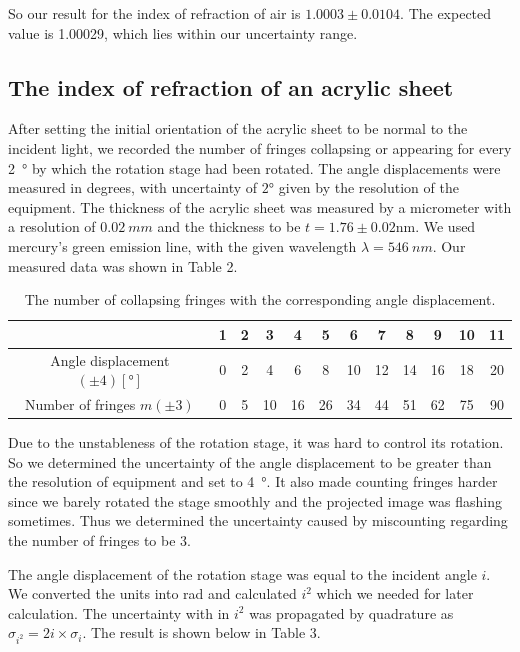 \documentclass[12pt]{article}
\begin{document}
So our result for the index of refraction of air is $1.0003\pm{0.0104}$.  The expected value is 1.00029, which lies within our uncertainty range.

\subsection{The index of refraction of an acrylic sheet}

After setting the initial orientation of the acrylic sheet to be normal to the incident light, we recorded the number of fringes collapsing or appearing for every \SI{2}{\degree} by which the rotation stage had been rotated. The angle displacements were measured in degrees, with uncertainty of $2$\si{\degree} given by the resolution of the equipment. The thickness of the acrylic sheet was measured by a micrometer with a resolution of $\SI{0.02}{mm}$ and the thickness to be  $t=1.76\pm0.02$\si{nm}. We used mercury's green emission line, with the given wavelength $\lambda=\SI{546}{nm}$. Our measured data was shown in Table 2. 

\begin{table}[!hb]
	
	\begin{center}
		\caption{The number of collapsing fringes with the corresponding angle displacement. }
		\begin{tabular}{|c|c|c|c|c|c|c|c|c|c|c|c|}
			\hline\hline
			& 1 & 2 & 3 & 4&5&6&7&8&9&10&11\\ \hline
			Angle displacement $(\pm{4}) [\si{\degree}]$ &0&2&4&6&8&10&12&14&16&18&20\\
			\hline
			Number of fringes $m (\pm{3})$&0&5&10&16&26&34&44&51&62&75&90\\ \hline
			
		\end{tabular}
	\end{center}
\end{table}

Due to the unstableness of the rotation stage, it was hard to control its rotation. So we determined the uncertainty of the angle displacement to be greater than the resolution of equipment and set to \SI{4}{\degree}. It also made counting fringes harder since we barely rotated the stage smoothly and the projected image was flashing sometimes. Thus we determined the uncertainty caused by miscounting regarding the number of fringes to be 3. 

The angle displacement of the rotation stage was equal to the incident angle $i$. We converted the units into \si{\radian} and calculated $i^2$ which we needed for later calculation. The uncertainty with in $i^2$ was propagated by quadrature as $\sigma_{i^{2}}=2{i}\times{\sigma_{i}}$. The result is shown below in Table 3.
\end{document}
